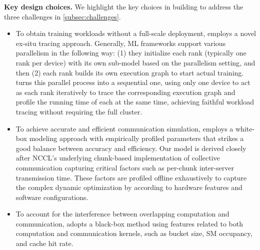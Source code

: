 \noindent\textbf{Key design choices.}
We highlight the key choices in building \sys to address the three challenges in \cref{subsec:challenges}. 
\begin{itemize}[leftmargin=*]

\item To obtain training workloads without a full-scale deployment, \sys employs a novel ex-situ tracing approach. 
Generally, ML frameworks support various parallelism in the following way: (1) they initialize each rank (typically one rank per device) with its own sub-model based on the parallelism setting, and then (2) each rank builds its own execution graph to start actual training. 
\sys turns this parallel process into a sequential one, using only one device to act as each rank iteratively to trace the corresponding execution graph and profile the running time of each \op at the same time, achieving faithful workload tracing without requiring the full cluster.


\item To achieve accurate and efficient communication simulation, \sys employs a white-box modeling approach with empirically profiled parameters that strikes a good balance between accuracy and efficiency.
Our model is derived closely after NCCL's underlying chunk-based implementation of collective communication capturing critical factors such as per-chunk inter-server transmission time. 
These factors are profiled offline exhaustively to capture the complex dynamic optimization by \nccl according to hardware features and software configurations.

\item To account for the interference between overlapping computation and communication, \sys adopts a black-box method using features related to both computation and communication kernels, such as bucket size, SM occupancy, and cache hit rate.
\end{itemize}
